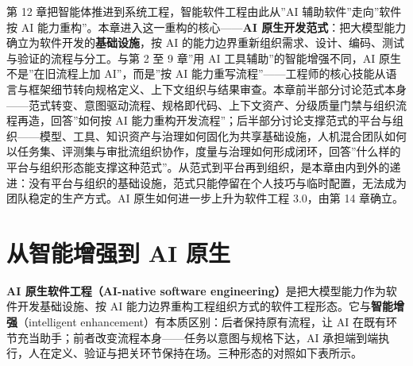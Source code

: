 \documentclass[
]{ctexbook}
\begin{document}
第 12 章把智能体推进到系统工程，智能软件工程由此从''AI
辅助软件''走向''软件按 AI
能力重构''。本章进入这一重构的核心------\textbf{AI
原生开发范式}：把大模型能力确立为软件开发的\textbf{基础设施}，按 AI
的能力边界重新组织需求、设计、编码、测试与验证的流程与分工。与第 2 至 9
章''用 AI 工具辅助''的智能增强不同，AI 原生不是''在旧流程上加
AI''，而是''按 AI
能力重写流程''------工程师的核心技能从语言与框架细节转向规格定义、上下文组织与结果审查。本章前半部分讨论范式本身------范式转变、意图驱动流程、规格即代码、上下文资产、分级质量门禁与组织流程再造，回答''如何按
AI
能力重构开发流程''；后半部分讨论支撑范式的平台与组织------模型、工具、知识资产与治理如何固化为共享基础设施，人机混合团队如何以任务集、评测集与审批流组织协作，度量与治理如何形成闭环，回答''什么样的平台与组织形态能支撑这种范式''。从范式到平台再到组织，是本章由内到外的递进：没有平台与组织的基础设施，范式只能停留在个人技巧与临时配置，无法成为团队稳定的生产方式。AI
原生如何进一步上升为软件工程 3.0，由第 14 章确立。

\section{从智能增强到 AI
原生}\label{ux4eceux667aux80fdux589eux5f3aux5230-ai-ux539fux751f}

\textbf{AI 原生软件工程（AI-native software
engineering）}是把大模型能力作为软件开发基础设施、按 AI
能力边界重构工程组织方式的软件工程形态。它与\textbf{智能增强}（intelligent
enhancement）有本质区别：后者保持原有流程，让 AI
在既有环节充当助手；前者改变流程本身------任务以意图与规格下达，AI
承担端到端执行，人在定义、验证与把关环节保持在场。三种形态的对照如下表所示。
\end{document}
